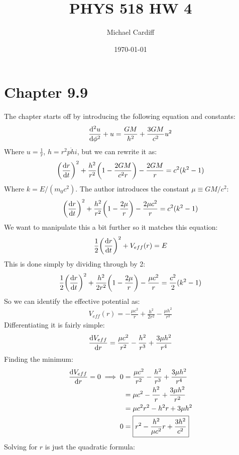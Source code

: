 \documentclass[12pt]{article}
\title{PHYS 518 HW 4}
\author{Michael Cardiff}
\date{\today}
\begin{document}
\maketitle

\section{Chapter 9.9}
The chapter starts off by introducing the following equation and constants:
\begin{align*}
  \dv[2]{u}{\phi}+u=\frac{GM}{h^2}+\frac{3GM}{c^2}u^2
\end{align*}
Where $u=\frac{1}{r}$, $h=r^2\dot{phi}$, but we can rewrite it as:
\begin{align*}
  \qty(\dv{r}{t})^2+\frac{h^2}{r^2}\qty(1-\frac{2GM}{c^2r})-\frac{2GM}{r}=
  c^2(k^2-1)
\end{align*}
Where $k=E/(m_0c^2)$. The author introduces the constant $\mu\equiv GM/c^2$:
\begin{align*}
  \qty(\dv{r}{t})^2+\frac{h^2}{r^2}\qty(1-\frac{2\mu}{r})-\frac{2\mu c^2}{r}=
  c^2(k^2-1)
\end{align*}
We want to manipulate this a bit further so it matches this equation:
\begin{align*}
  \frac{1}{2}\qty(\dv{r}{t})^2+V_{eff}(r)=E
\end{align*}
This is done simply by dividing through by 2:
\begin{align*}
  \frac{1}{2}\qty(\dv{r}{t})^2
  +\frac{h^2}{2r^2}\qty(1-\frac{2\mu}{r})
  -\frac{\mu c^2}{r}=\frac{c^2}{2}(k^2-1)
\end{align*}
So we can identify the effective potential as:
\begin{align*}
  V_{eff}(r)=-\frac{\mu c^2}{r}+\frac{h^2}{2r^2}-\frac{\mu h^2}{r^3}
\end{align*}
Differentiating it is fairly simple:
\begin{align*}
  \dv{V_{eff}}{r}=\frac{\mu c^2}{r^2}-\frac{h^2}{r^3}+\frac{3\mu h^2}{r^4}
\end{align*}
Finding the minimum:
\begin{align*}
  \dv{V_{eff}}{r}=0\implies
  0&=\frac{\mu c^2}{r^2}-\frac{h^2}{r^3}+\frac{3\mu h^2}{r^4}\\
  &=\mu c^2-\frac{h^2}{r}+\frac{3\mu h^2}{r^2}\\
  &=\mu c^2r^2-h^2r+3\mu h^2\\
  0&=\boxed{r^2-\frac{h^2}{\mu c^2}r+\frac{3h^2}{c^2}}
\end{align*}
Solving for $r$ is just the quadratic formula:
\end{document}
